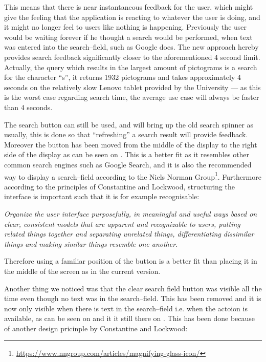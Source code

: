 This means that there is near instantaneous feedback for the user, which might give the feeling that the application is reacting to whatever the user is doing, and it might no longer feel to users like nothing is happening.
Previously the user would be waiting forever if he thought a search would be performed, when text was entered into the search--field, such as Google does.
The new approach hereby provides search feedback significantly closer to the aforementioned 4 second limit.
Actually, the query which results in the largest amount of pictograms is a search for the character \enquote{s}, it returns 1932 pictograms and takes approximately 4 seconds on the relatively slow Lenovo tablet provided by the University --- as this is the worst case regarding search time, the average use case will always be faster than 4 seconds.

The search button can still be used, and will bring up the old search spinner as usually, this is done so that \enquote{refreshing} a search result will provide feedback.
Moreover the button has been moved from the middle of the display to the right side of the display as can be seen on .
This is a better fit as it resembles other common search engines such as Google Search, and it is also the recommended way to display a search--field according to the Niels Norman Group\footnote{\url{https://www.nngroup.com/articles/magnifying-glass-icon/}}.
Furthermore according to the principles of Constantine and Lockwood, structuring the interface is important such that it is for example recognisable:

\begin{displayquote}
\textit{Organize the user interface purposefully, in meaningful and useful ways based on clear, consistent models that are apparent and recognizable to users, putting related things together and separating unrelated things, differentiating dissimilar things and making similar things resemble one
another.}\cite[p.~51]{DESIGNBOOK}
\end{displayquote}
\noindent
Therefore using a familiar position of the button is a better fit than placing it in the middle of the screen as in the current version.

Another thing we noticed was that the clear search field button was visible all the time even though no text was in the search--field.
This has been removed and it is now only visible when there is text in the search--field i.e. when the actoion is available, as can be seen on  and it it still there on .
This has been done because of another design pricinple by Constantine and Lockwood:

